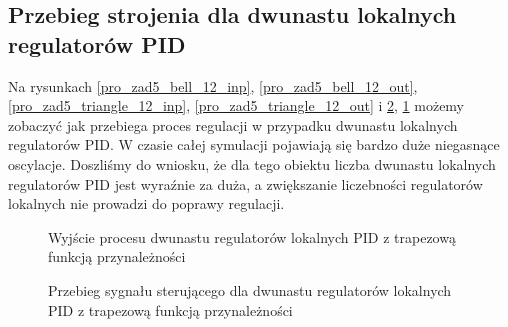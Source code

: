 \subsection{Przebieg strojenia dla dwunastu lokalnych regulatorów PID}
Na rysunkach \ref{pro_zad5_bell_12_inp}, \ref{pro_zad5_bell_12_out}, \ref{pro_zad5_triangle_12_inp}, \ref{pro_zad5_triangle_12_out} i \ref{pro_zad5_trapezoid_12_inp}, \ref{pro_zad5_trapezoid_12_out} możemy zobaczyć jak przebiega proces regulacji w przypadku dwunastu lokalnych regulatorów PID. W czasie całej symulacji pojawiają się bardzo duże niegasnące oscylacje. Doszliśmy do wniosku, że dla tego obiektu liczba dwunastu lokalnych regulatorów PID jest wyraźnie za duża, a zwiększanie liczebności regulatorów lokalnych nie prowadzi do poprawy regulacji.  
\begin{figure}[b]
    \centering
    \caption{Wyjście procesu dwunastu regulatorów lokalnych PID z trapezową funkcją przynależności}
    \label{pro_zad5_trapezoid_12_out}
\end{figure}

\begin{figure}[b]
    \centering
    \caption{Przebieg sygnału sterującego dla dwunastu regulatorów lokalnych PID z trapezową funkcją przynależności}
    \label{pro_zad5_trapezoid_12_inp}
\end{figure}


